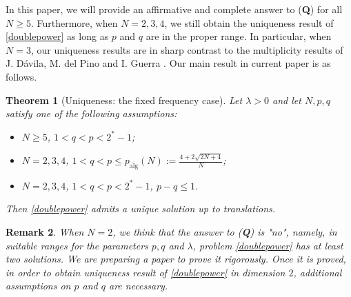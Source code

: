 \documentclass{article}
\newtheorem{theorem}{Theorem}[section]
\newtheorem{remark}[theorem]{Remark}
\theoremstyle{definition} \theoremstyle{remark}
\numberwithin{equation}{section}
\newcommand{\la}{\lambda}
\begin{document}
\vskip0.16in



	In this paper, we will provide an affirmative and complete answer to (\textbf{Q}) for all $N \ge 5$. Furthermore, when $N = 2,3,4$, we still obtain the uniqueness result of \eqref{doublepower} as long as  $p$  and  $q$  are in the proper range.  In particular, when $N=3$, our uniqueness results  are in sharp contrast to the multiplicity results of  J. D\'avila, M. del Pino and I. Guerra \cite{DPG}. Our main result in current paper  is as follows.















\newpage

	\begin{theorem}[Uniqueness: the fixed frequency case] \label{thmmain}
		Let $\la > 0$ and let $N, p, q$ satisfy one of the following assumptions:
		\begin{itemize}
			\item[(1)] $N \ge 5$, $1 < q < p < 2^* -1$;
			\item[(2)] $N = 2,3,4$, $1 < q < p \le p_{\text{alg}}(N) := \frac{4 + 2\sqrt{2N + 4}}{N}$;
			\item[(3)] $N = 2,3,4$, $1 < q < p < 2^* -1$, $p - q \le 1$.
		\end{itemize}
		Then \eqref{doublepower} admits a unique solution up to translations.
	\end{theorem}


	\begin{remark}
		When $N =2$, we think that the answer to (\textbf{Q}) is "no", namely, in suitable ranges for the parameters $p, q$ and $\la$, problem \eqref{doublepower} has at least two solutions. We are preparing a paper to prove it rigorously.	Once it is proved, in order to obtain uniqueness result of \eqref{doublepower} in dimension $2$, additional assumptions on $p$ and $q$ are necessary.	
	\end{remark}
\end{document}
